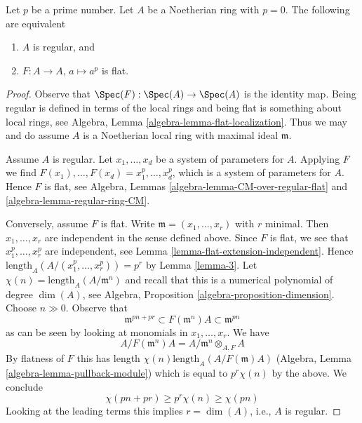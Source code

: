 \begin{lemma}[Kunz]
\label{lemma-frobenius-flat-regular}
\begin{reference}
\cite{Kunz-flat}
\end{reference}
Let $p$ be a prime number.
Let $A$ be a Noetherian ring with $p = 0$.
The following are equivalent
\begin{enumerate}
\item $A$ is regular, and
\item $F : A \to A$, $a \mapsto a^p$ is flat.
\end{enumerate}
\end{lemma}

\begin{proof}
Observe that $\Spec(F) : \Spec(A) \to \Spec(A)$ is the identity map.
Being regular is defined in terms of the local rings and being flat
is something about local rings, see
Algebra, Lemma \ref{algebra-lemma-flat-localization}.
Thus we may and do assume $A$ is a Noetherian
local ring with maximal ideal $\mathfrak m$.

\medskip\noindent
Assume $A$ is regular. Let $x_1, \ldots, x_d$ be a
system of parameters for $A$. Applying $F$ we find
$F(x_1), \ldots, F(x_d) = x_1^p, \ldots, x_d^p$,
which is a system of parameters for $A$. Hence $F$ is flat, see
Algebra, Lemmas \ref{algebra-lemma-CM-over-regular-flat} and
\ref{algebra-lemma-regular-ring-CM}.

\medskip\noindent
Conversely, assume $F$ is flat. Write $\mathfrak m = (x_1, \ldots, x_r)$
with $r$ minimal. Then $x_1, \ldots, x_r$ are independent in the sense
defined above. Since $F$ is flat, we see that $x_1^p, \ldots, x_r^p$
are independent, see Lemma \ref{lemma-flat-extension-independent}.
Hence $\text{length}_A(A/(x_1^p, \ldots, x_r^p)) = p^r$ by
Lemma \ref{lemma-3}.
Let $\chi(n) = \text{length}_A(A/\mathfrak m^n)$ and recall
that this is a numerical polynomial of degree $\dim(A)$, see
Algebra, Proposition \ref{algebra-proposition-dimension}.
Choose $n \gg 0$. Observe that
$$
\mathfrak m^{pn + pr} \subset F(\mathfrak m^n)A \subset \mathfrak m^{pn}
$$
as can be seen by looking at monomials in $x_1, \ldots, x_r$. We have
$$
A/F(\mathfrak m^n)A = A/\mathfrak m^n \otimes_{A, F} A
$$
By flatness of $F$ this has length $\chi(n) \text{length}_A(A/F(\mathfrak m)A)$
(Algebra, Lemma \ref{algebra-lemma-pullback-module})
which is equal to $p^r\chi(n)$ by the above. We conclude
$$
\chi(pn + pr) \geq p^r\chi(n) \geq \chi(pn)
$$
Looking at the leading terms this implies $r = \dim(A)$, i.e., $A$ is regular.
\end{proof}